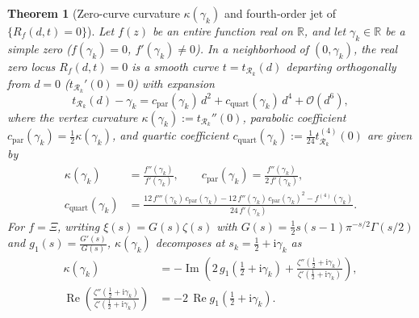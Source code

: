 \documentclass[11pt,a4paper,reqno]{amsart}
\newtheorem{theorem}{Theorem}[section]
\theoremstyle{definition}
\theoremstyle{remark}
\numberwithin{equation}{section}
\newcommand{\ii}{\mathrm{i}}
\newcommand{\Rea}{\operatorname{Re}}
\newcommand{\Ima}{\operatorname{Im}}
\begin{document}
\begin{theorem}[Zero-curve curvature $\kappa(\gamma_k)$ and fourth-order jet of $\{R_f(d,t) = 0\}$]\label{thm:parabolic_curvature}
Let $f(z)$ be an entire function real on $\mathbb{R}$, and let $\gamma_k \in \mathbb{R}$ be a simple zero ($f(\gamma_k) = 0$, $f'(\gamma_k) \neq 0$). In a neighborhood of $(0, \gamma_k)$, the real zero locus $R_f(d,t) = 0$ is a smooth curve $t = t_{\mathcal{R}_k}(d)$ departing orthogonally from $d = 0$ ($t_{\mathcal{R}_k}'(0) = 0$) with expansion
\begin{equation}\label{eq:t_Rk_expansion}
t_{\mathcal{R}_k}(d) - \gamma_k = c_{\mathrm{par}}(\gamma_k)\,d^2 + c_{\mathrm{quart}}(\gamma_k)\,d^4 + \mathcal{O}(d^6),
\end{equation}
where the vertex curvature $\kappa(\gamma_k) := t_{\mathcal{R}_k}''(0)$, parabolic coefficient $c_{\mathrm{par}}(\gamma_k) = \frac{1}{2}\kappa(\gamma_k)$, and quartic coefficient $c_{\mathrm{quart}}(\gamma_k) := \frac{1}{24}t_{\mathcal{R}_k}^{(4)}(0)$ are given by
\begin{equation}\label{eq:kappa_and_cquart}
\begin{aligned}
\kappa(\gamma_k) &= \frac{f''(\gamma_k)}{f'(\gamma_k)}, \qquad c_{\mathrm{par}}(\gamma_k) = \frac{f''(\gamma_k)}{2\,f'(\gamma_k)}, \\
c_{\mathrm{quart}}(\gamma_k) &= \frac{12\,f'''(\gamma_k)\,c_{\mathrm{par}}(\gamma_k) - 12\,f''(\gamma_k)\,c_{\mathrm{par}}(\gamma_k)^2 - f^{(4)}(\gamma_k)}{24\,f'(\gamma_k)}.
\end{aligned}
\end{equation}
For $f = \Xi$, writing $\xi(s) = G(s)\zeta(s)$ with $G(s) = \frac{1}{2}s(s-1)\pi^{-s/2}\Gamma(s/2)$ and $g_1(s) = \frac{G'(s)}{G(s)}$, $\kappa(\gamma_k)$ decomposes at $s_k = \frac{1}{2} + \ii\gamma_k$ as
\begin{equation}\label{eq:kappa_arch_zeta}
\begin{aligned}
\kappa(\gamma_k) &= -\Ima\left(2\,g_1\left(\frac{1}{2}+\ii\gamma_k\right) + \frac{\zeta''\left(\frac{1}{2}+\ii\gamma_k\right)}{\zeta'\left(\frac{1}{2}+\ii\gamma_k\right)}\right), \\
\Rea\left(\frac{\zeta''\left(\frac{1}{2}+\ii\gamma_k\right)}{\zeta'\left(\frac{1}{2}+\ii\gamma_k\right)}\right) &= -2\,\Rea g_1\left(\frac{1}{2}+\ii\gamma_k\right).
\end{aligned}
\end{equation}
\end{theorem}
\end{document}
